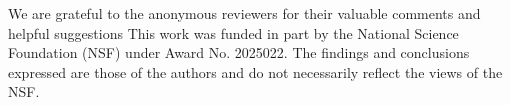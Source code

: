\begin{acks}
We are grateful to the anonymous reviewers for their valuable comments and helpful suggestions
This work was funded in part by the National Science Foundation (NSF) under Award No. 2025022. The findings and conclusions expressed are those of the authors and do not necessarily reflect the views of the NSF.
\end{acks}